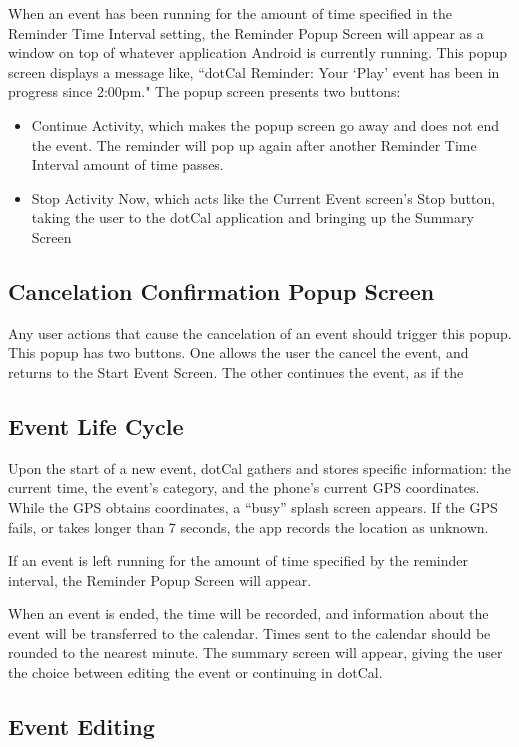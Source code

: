 \documentclass[11pt]{article}
\newcommand{\bt}[1]{{\sc #1}}
\begin{document}
When an event has been running for the amount of time specified in the Reminder Time Interval setting, the Reminder Popup Screen will appear as a window on top of whatever application Android is currently running. This popup screen displays a message like, ``dotCal Reminder: Your `Play' event has been in progress since 2:00pm." The popup screen presents two buttons:
\begin{itemize}
	\item{\bt{Continue Activity}, which makes the popup screen go away and does not end the event. The reminder will pop up again after another Reminder Time Interval amount of time passes.}
	\item{\bt{Stop Activity Now}, which acts like the Current Event screen's Stop button, taking the user to the dotCal application and bringing up the Summary Screen}
\end{itemize}

\subsection{Cancelation Confirmation Popup Screen}

Any user actions that cause the cancelation of an event should trigger this popup. This popup has two buttons. One allows the user the cancel the event, and returns to the Start Event Screen. The other continues the event, as if the 

\subsection{Event Life Cycle}

Upon the start of a new event, dotCal gathers and stores specific information: the current time, the event's category, and the phone's current GPS coordinates. While the GPS obtains coordinates, a ``busy'' splash screen appears. If the GPS fails, or takes longer than 7 seconds, the app records the location as unknown.

If an event is left running for the amount of time specified by the reminder interval, the Reminder Popup Screen will appear.

When an event is ended, the time will be recorded, and information about the event will be transferred to the calendar. Times sent to the calendar should be  rounded to the nearest minute. The summary screen will appear, giving the user the choice between editing the event or continuing in dotCal.


\subsection{Event Editing}
\end{document}
